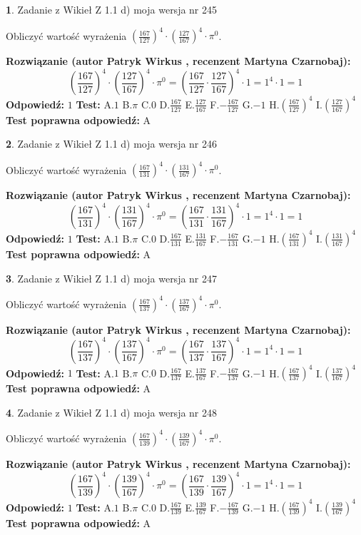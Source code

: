 \documentclass[12pt, a4paper]{article}
\theoremstyle{definition} %
\newtheorem{zad}{}
\newcommand{\zadStart}[1]{\begin{zad}#1\newline}
\newcommand{\zadStop}{\end{zad}}
\newcommand{\rozwStart}[2]{\noindent \textbf{Rozwiązanie (autor #1 , recenzent #2): }\newline}
\newcommand{\rozwStop}{\newline}
\newcommand{\odpStart}{\noindent \textbf{Odpowiedź:}\newline}
\newcommand{\odpStop}{\newline}
\newcommand{\testStart}{\noindent \textbf{Test:}\newline}
\newcommand{\testStop}{\newline}
\newcommand{\kluczStart}{\noindent \textbf{Test poprawna odpowiedź:}\newline}
\newcommand{\kluczStop}{\newline}
\begin{document}
\zadStart{Zadanie z Wikieł Z 1.1 d) moja wersja nr 245}

Obliczyć wartość wyrażenia $(\frac{167}{127})^{4} \cdot (\frac{127}{167})^{4} \cdot \pi^{0}$.
\zadStop
\rozwStart{Patryk Wirkus}{Martyna Czarnobaj}
$$(\frac{167}{127})^{4} \cdot (\frac{127}{167})^{4} \cdot \pi^{0} = (\frac{167}{127} \cdot \frac{127}{167})^{4} \cdot 1 = 1^{4} \cdot 1 = 1$$
\rozwStop
\odpStart
$1$
\odpStop
\testStart
A.$1$ B.$\pi$ C.$0$ D.$\frac{167}{127}$ E.$\frac{127}{167}$
F.$-\frac{167}{127}$ G.$-1$
H.$(\frac{167}{127})^{4}$
I.$(\frac{127}{167})^{4}$
\testStop
\kluczStart
A
\kluczStop



\zadStart{Zadanie z Wikieł Z 1.1 d) moja wersja nr 246}

Obliczyć wartość wyrażenia $(\frac{167}{131})^{4} \cdot (\frac{131}{167})^{4} \cdot \pi^{0}$.
\zadStop
\rozwStart{Patryk Wirkus}{Martyna Czarnobaj}
$$(\frac{167}{131})^{4} \cdot (\frac{131}{167})^{4} \cdot \pi^{0} = (\frac{167}{131} \cdot \frac{131}{167})^{4} \cdot 1 = 1^{4} \cdot 1 = 1$$
\rozwStop
\odpStart
$1$
\odpStop
\testStart
A.$1$ B.$\pi$ C.$0$ D.$\frac{167}{131}$ E.$\frac{131}{167}$
F.$-\frac{167}{131}$ G.$-1$
H.$(\frac{167}{131})^{4}$
I.$(\frac{131}{167})^{4}$
\testStop
\kluczStart
A
\kluczStop



\zadStart{Zadanie z Wikieł Z 1.1 d) moja wersja nr 247}

Obliczyć wartość wyrażenia $(\frac{167}{137})^{4} \cdot (\frac{137}{167})^{4} \cdot \pi^{0}$.
\zadStop
\rozwStart{Patryk Wirkus}{Martyna Czarnobaj}
$$(\frac{167}{137})^{4} \cdot (\frac{137}{167})^{4} \cdot \pi^{0} = (\frac{167}{137} \cdot \frac{137}{167})^{4} \cdot 1 = 1^{4} \cdot 1 = 1$$
\rozwStop
\odpStart
$1$
\odpStop
\testStart
A.$1$ B.$\pi$ C.$0$ D.$\frac{167}{137}$ E.$\frac{137}{167}$
F.$-\frac{167}{137}$ G.$-1$
H.$(\frac{167}{137})^{4}$
I.$(\frac{137}{167})^{4}$
\testStop
\kluczStart
A
\kluczStop



\zadStart{Zadanie z Wikieł Z 1.1 d) moja wersja nr 248}

Obliczyć wartość wyrażenia $(\frac{167}{139})^{4} \cdot (\frac{139}{167})^{4} \cdot \pi^{0}$.
\zadStop
\rozwStart{Patryk Wirkus}{Martyna Czarnobaj}
$$(\frac{167}{139})^{4} \cdot (\frac{139}{167})^{4} \cdot \pi^{0} = (\frac{167}{139} \cdot \frac{139}{167})^{4} \cdot 1 = 1^{4} \cdot 1 = 1$$
\rozwStop
\odpStart
$1$
\odpStop
\testStart
A.$1$ B.$\pi$ C.$0$ D.$\frac{167}{139}$ E.$\frac{139}{167}$
F.$-\frac{167}{139}$ G.$-1$
H.$(\frac{167}{139})^{4}$
I.$(\frac{139}{167})^{4}$
\testStop
\kluczStart
A
\kluczStop
\end{document}
